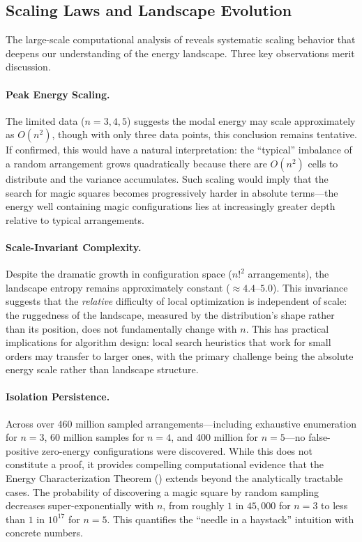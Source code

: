 \subsection{Scaling Laws and Landscape Evolution}

The large-scale computational analysis of  reveals 
systematic scaling behavior that deepens our understanding of the energy landscape.
Three key observations merit discussion.

\paragraph{Peak Energy Scaling.}
The limited data ($n=3,4,5$) suggests the modal energy may scale approximately as $O(n^2)$,
though with only three data points, this conclusion remains tentative.
If confirmed, this would have a natural interpretation:
the ``typical'' imbalance of a random arrangement grows quadratically 
because there are $O(n^2)$ cells to distribute and the variance accumulates.
Such scaling would imply that the search for magic squares becomes progressively harder 
in absolute terms---the energy well containing magic configurations lies at increasingly 
greater depth relative to typical arrangements.

\paragraph{Scale-Invariant Complexity.}
Despite the dramatic growth in configuration space ($n!^2$ arrangements),
the landscape entropy remains approximately constant ($\approx 4.4$--$5.0$).
This invariance suggests that the \emph{relative} difficulty of local optimization 
is independent of scale: the ruggedness of the landscape, 
measured by the distribution's shape rather than its position,
does not fundamentally change with $n$.
This has practical implications for algorithm design:
local search heuristics that work for small orders may transfer to larger ones,
with the primary challenge being the absolute energy scale rather than landscape structure.

\paragraph{Isolation Persistence.}
Across over 460 million sampled arrangements---including exhaustive enumeration for $n=3$,
60 million samples for $n=4$, and 400 million for $n=5$---no false-positive zero-energy 
configurations were discovered.
While this does not constitute a proof, it provides compelling computational evidence 
that the Energy Characterization Theorem () extends beyond the analytically tractable cases.
The probability of discovering a magic square by random sampling decreases super-exponentially 
with $n$, from roughly $1$ in $45{,}000$ for $n=3$ to less than $1$ in $10^{17}$ for $n=5$.
This quantifies the ``needle in a haystack'' intuition with concrete numbers.

